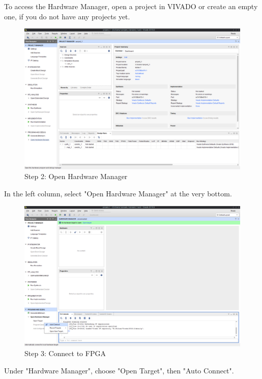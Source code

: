 To access the Hardware Manager, open a project in VIVADO or create an empty one, if you do not have any projects yet.

\begin{figure}
  \includegraphics[width=\linewidth]{images/vivado02.png}
  \caption{Step 2: Open Hardware Manager}
  \label{fig:vivado02}
\end{figure}

In the left column, select "Open Hardware Manager" at the very bottom.

\begin{figure}
  \includegraphics[width=\linewidth]{images/vivado03.png}
  \caption{Step 3: Connect to FPGA}
  \label{fig:vivado03}
\end{figure}

Under "Hardware Manager", choose "Open Target", then "Auto Connect".

